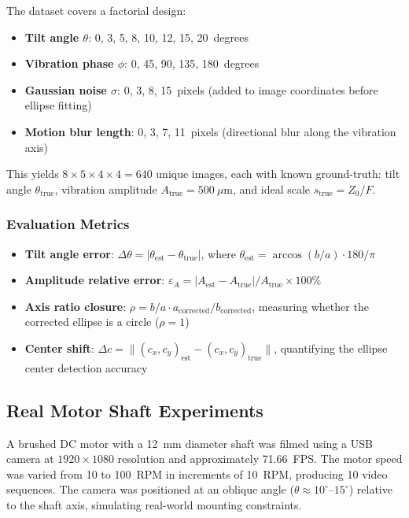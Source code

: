 \documentclass[journal]{IEEEtran}
\begin{document}
The dataset covers a factorial design:

\begin{itemize}
\item \textbf{Tilt angle $\theta$}: 0, 3, 5, 8, 10, 12, 15, 20~degrees
\item \textbf{Vibration phase $\phi$}: 0, 45, 90, 135, 180~degrees
\item \textbf{Gaussian noise $\sigma$}: 0, 3, 8, 15~pixels (added to image coordinates before ellipse fitting)
\item \textbf{Motion blur length}: 0, 3, 7, 11~pixels (directional blur along the vibration axis)
\end{itemize}

This yields $8 \times 5 \times 4 \times 4 = 640$ unique images, each with known
ground-truth: tilt angle $\theta_{\text{true}}$, vibration amplitude
$A_{\text{true}} = 500~\mu\text{m}$, and ideal scale $s_{\text{true}} = Z_0/F$.

\subsubsection{Evaluation Metrics}

\begin{itemize}
\item \textbf{Tilt angle error}: $\Delta\theta = |\theta_{\text{est}} - \theta_{\text{true}}|$,
where $\theta_{\text{est}} = \arccos(b/a) \cdot 180/\pi$
\item \textbf{Amplitude relative error}:
$\varepsilon_A = |A_{\text{est}} - A_{\text{true}}| / A_{\text{true}} \times 100\%$
\item \textbf{Axis ratio closure}: $\rho = b/a \cdot a_{\text{corrected}}/b_{\text{corrected}}$,
measuring whether the corrected ellipse is a circle ($\rho = 1$)
\item \textbf{Center shift}: $\Delta c = \|(c_x, c_y)_{\text{est}} - (c_x, c_y)_{\text{true}}\|$,
quantifying the ellipse center detection accuracy
\end{itemize}

\subsection{Real Motor Shaft Experiments}

A brushed DC motor with a 12~mm diameter shaft was filmed using a USB camera
at $1920\times 1080$ resolution and approximately 71.66~FPS. The motor speed
was varied from 10 to 100~RPM in increments of 10~RPM, producing 10 video
sequences. The camera was positioned at an oblique angle ($\theta \approx
10^{\circ}$--$15^{\circ}$) relative to the shaft axis, simulating real-world
mounting constraints.
\end{document}
